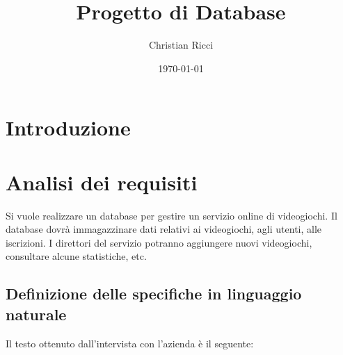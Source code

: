 \documentclass[a4paper,12pt]{report}
\title{Progetto di Database}
\author{Christian Ricci}
\date{\today}
\begin{document}
\maketitle
\tableofcontents

\chapter{Introduzione}



\chapter{Analisi dei requisiti}

Si vuole realizzare un database per gestire un servizio online di videogiochi. Il database dovrà immagazzinare dati relativi ai videogiochi, agli utenti, alle iscrizioni. I direttori del servizio potranno aggiungere nuovi videogiochi, consultare alcune statistiche, etc.

\section{Definizione delle specifiche in linguaggio naturale}

Il testo ottenuto dall'intervista con l'azienda è il seguente:
\end{document}
